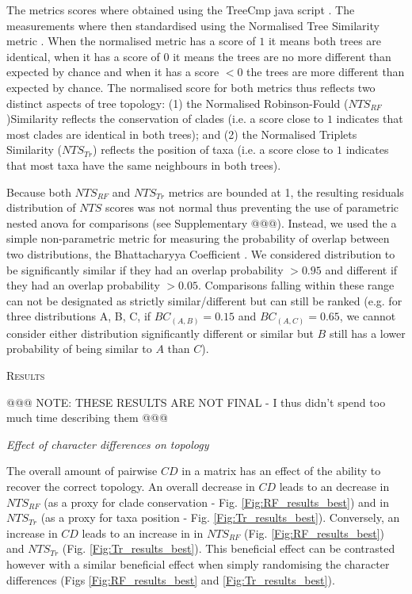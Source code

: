 \documentclass[12pt,letterpaper]{article}
\renewcommand{\section}[1]{%
\bigskip
\begin{center}
\begin{Large}
\normalfont\scshape #1
\medskip
\end{Large}
\end{center}}
\renewcommand{\subsection}[1]{%
\bigskip
\begin{center}
\begin{large}
\normalfont\itshape #1
\end{large}
\end{center}}
\begin{document}
The metrics scores where obtained using the TreeCmp java script \citep{Bogdanowicz2012}.
The measurements where then standardised using the Normalised Tree Similarity metric \citep[$NTS$; i.e. centering the metrics scores using the mean metric score for 1000 pairwise comparisons between random trees with $n$ taxa;][]{Bogdanowicz2012,Guillerme2016146}.
When the normalised metric has a score of $1$ it means both trees are identical, when it has a score of $0$ it means the trees are no more different than expected by chance and when it has a score $<0$ the trees are more different than expected by chance.
The normalised score for both metrics thus reflects two distinct aspects of tree topology: (1) the Normalised Robinson-Fould ($NTS_{RF}$)Similarity reflects the conservation of clades (i.e. a score close to $1$ indicates that most clades are identical in both trees); and (2) the Normalised Triplets Similarity ($NTS_{Tr}$) reflects the position of taxa (i.e. a score close to $1$ indicates that most taxa have the same neighbours in both trees).

Because both $NTS_{RF}$ and $NTS_{Tr}$ metrics are bounded at 1, the resulting residuals distribution of $NTS$ scores was not normal thus preventing the use of parametric nested anova for comparisons (see Supplementary @@@).
Instead, we used the a simple non-parametric metric for measuring the probability of overlap between two distributions, the Bhattacharyya Coefficient \citep[$BC$;][]{Bhattacharyya,Guillerme2016146,soto2016trace}.
We considered distribution to be significantly similar if they had an overlap probability $>0.95$ and different if they had an overlap probability $>0.05$.
Comparisons falling within these range can not be designated as strictly similar/different but can still be ranked (e.g. for three distributions A, B, C, if $BC_{(A,B)} = 0.15$ and $BC_{(A,C)} = 0.65$, we cannot consider either distribution significantly different or similar but $B$ still has a lower probability of being similar to $A$ than $C$).


\section{Results}

@@@ NOTE: THESE RESULTS ARE NOT FINAL - I thus didn't spend too much time describing them @@@

\subsection{Effect of character differences on topology}
The overall amount of pairwise $CD$ in a matrix has an effect of the ability to recover the correct topology.
An overall decrease in $CD$ leads to an decrease in $NTS_{RF}$ (as a proxy for clade conservation - Fig. \ref{Fig:RF_results_best}) and in $NTS_{Tr}$ (as a proxy for taxa position - Fig. \ref{Fig:Tr_results_best}).
Conversely, an increase in $CD$ leads to an increase in in $NTS_{RF}$ (Fig. \ref{Fig:RF_results_best}) and $NTS_{Tr}$ (Fig. \ref{Fig:Tr_results_best}).
This beneficial effect can be contrasted however with a similar beneficial effect when simply randomising the character differences (Figs \ref{Fig:RF_results_best} and \ref{Fig:Tr_results_best}).
\end{document}

